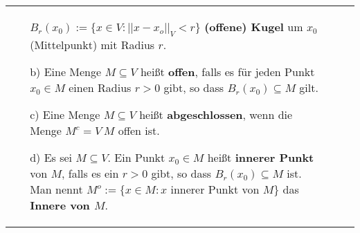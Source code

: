 \begin{longtable}{p{0.75cm} p{1cm} p{16cm}}
\begin{itemize}[topsep=-0.5cm]
                                        $B_r(x_0) := \{x \in V: ||x-x_o||_V < r\} $ \textbf{(offene) Kugel} um $x_0$ (Mittelpunkt) mit Radius $r$.
                            \item[b)] Eine Menge $M \subseteq V$ heißt \textbf{offen}, falls es für jeden Punkt $x_0 \in M$ einen Radius
                                        $r > 0$ gibt, so dass $B_r(x_0) \subseteq M$ gilt.
                            \item[c)] Eine Menge $M \subseteq V$ heißt \textbf{abgeschlossen}, wenn die Menge $M^c = V \ M$ offen ist.
                            \item[d)] Es sei $M \subseteq V$. Ein Punkt $x_0 \in M$ heißt \textbf{innerer Punkt} von $M$, falls es ein
                                        $r > 0$ gibt, so dass $B_r(x_0) \subseteq M$ ist. \hfill \break 
                                        Man nennt $M^o := \{x \in M: x$ innerer Punkt von $M$\} das \textbf{Innere von $M$}.    


\end{itemize}
\end{longtable}
